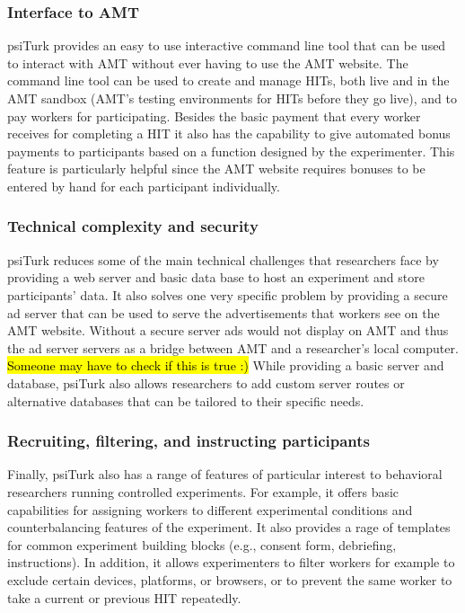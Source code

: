 \documentclass[twocolumn]{svjour3}          %
\begin{document}
\subsubsection{Interface to AMT}
psiTurk provides an easy to use interactive command line tool that can be used to 
interact with AMT without ever having to use the AMT website.  
The command line tool can be used to create and manage HITs, both live and in the AMT sandbox 
(AMT's testing environments for HITs before they go live), and to pay workers for
participating. Besides the basic payment that every worker receives for completing a HIT
it also has the capability to give automated bonus payments to participants based on a function
designed by the experimenter. This feature is particularly helpful since the AMT website
requires bonuses to be entered by hand for each participant individually.


\subsubsection{Technical complexity and security}
psiTurk reduces some of the main technical challenges that researchers face by providing a 
web server and basic data base to host an experiment and store participants' data. 
It also solves one very specific problem by providing a secure ad server that can
be used to serve the advertisements that workers see on the AMT website. Without  a secure server
 ads would not display on AMT and thus the ad server servers as a bridge between AMT and 
 a researcher's local computer. \hl{Someone may have to check if this is true :)} 
While providing a basic server and database, psiTurk also allows researchers to add custom
server routes or alternative databases that can be tailored to their specific needs. 


\subsubsection{Recruiting, filtering, and instructing participants}
Finally, psiTurk also has a range of features of particular interest to behavioral researchers
running controlled experiments. 
For example, it offers basic capabilities for assigning workers to different experimental conditions 
and counterbalancing features of the experiment. It also provides  a rage of templates
for common experiment building blocks (e.g., consent form, debriefing, instructions).
In addition, it allows experimenters to filter workers for example to exclude certain devices, platforms, or browsers, 
or to prevent the same worker to take a current or previous HIT repeatedly.
\end{document}
